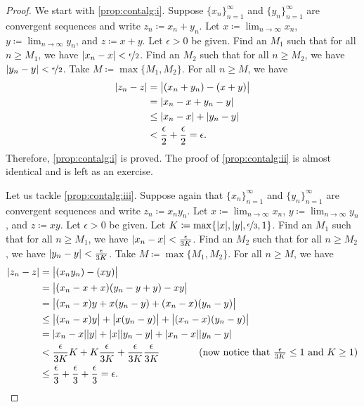 \begin{proof}
We start with \ref{prop:contalg:i}.
Suppose $\{ x_n \}_{n=1}^\infty$ and $\{ y_n \}_{n=1}^\infty$ are convergent sequences and
write $z_n \coloneqq x_n + y_n$.  Let $x \coloneqq \lim_{n\to\infty} x_n$,
$y \coloneqq \lim_{n\to\infty} y_n$, and $z \coloneqq x+y$.
Let $\epsilon > 0$ be given.  
Find an $M_1$ such that for all $n \geq M_1$,
we have
$\lvert {x_n - x} \rvert < \nicefrac{\epsilon}{2}$.  
Find an $M_2$ such that for all $n \geq M_2$,
we have
$\lvert {y_n - y} \rvert < \nicefrac{\epsilon}{2}$.  Take $M \coloneqq \max \{ M_1, M_2 \}$.
For all $n \geq M$, we have
\begin{equation*}
\begin{split}
\lvert {z_n - z} \rvert &=
\bigl\lvert {(x_n+y_n) - (x+y)} \bigr\rvert \\
& =
\lvert {x_n-x + y_n-y} \rvert \\
& \leq
\lvert {x_n-x} \rvert + \lvert {y_n-y} \rvert \\
& <
\frac{\epsilon}{2} +
\frac{\epsilon}{2}
= \epsilon.
\end{split}
\end{equation*}
Therefore, \ref{prop:contalg:i} is proved.
The proof of \ref{prop:contalg:ii} is almost identical and is left as an
exercise.

Let us tackle 
\ref{prop:contalg:iii}.
Suppose again that $\{ x_n \}_{n=1}^\infty$ and $\{ y_n \}_{n=1}^\infty$ are convergent sequences and
write $z_n \coloneqq x_n y_n$.  Let $x \coloneqq \lim_{n\to\infty} x_n$,
$y \coloneqq \lim_{n\to\infty} y_n$, and $z \coloneqq xy$.
Let $\epsilon > 0$ be given.
Let $K \coloneqq \max\{ \lvert {x} \rvert, \lvert {y} \rvert, \nicefrac{\epsilon}{3} , 1 \}$.
Find an $M_1$ such that for all $n \geq M_1$,
we have
$\lvert {x_n - x} \rvert < \frac{\epsilon}{3K}$.
Find an $M_2$ such that for all $n \geq M_2$,
we have
$\lvert {y_n - y} \rvert < \frac{\epsilon}{3K}$.  Take $M \coloneqq \max \{ M_1, M_2 \}$.
For all $n \geq M$, we have
\begin{equation*}
\begin{split}
\lvert {z_n - z} \rvert &=
\bigl\lvert {(x_ny_n) - (xy)} \bigr\rvert \\
& =
\bigl\lvert {(x_n-x+x)(y_n-y+y) - xy} \bigr\rvert \\
& =
\bigl\lvert {(x_n-x)y + x(y_n-y) +(x_n-x)(y_n-y)} \bigr\rvert \\
& \leq
\bigl\lvert {(x_n-x)y} \bigr\rvert + \bigl\lvert {x(y_n - y)} \bigr\rvert +
\bigl\lvert {(x_n-x)(y_n-y)} \bigr\rvert \\
& =
\lvert {x_n -x} \rvert\lvert {y} \rvert + 
\lvert {x} \rvert\lvert {y_n -y} \rvert + 
\lvert {x_n -x} \rvert\lvert {y_n -y} \rvert
\\
& <
\frac{\epsilon}{3K} K + 
K \frac{\epsilon}{3K} + 
\frac{\epsilon}{3K}
\frac{\epsilon}{3K}
\qquad \qquad \text{(now notice that } \tfrac{\epsilon}{3K} \leq 1
\text{ and }
K \geq 1\text{)}
\\
& \leq
\frac{\epsilon}{3} + \frac{\epsilon}{3} + \frac{\epsilon}{3}
 = \epsilon .
\end{split}
\end{equation*}


\end{proof}
